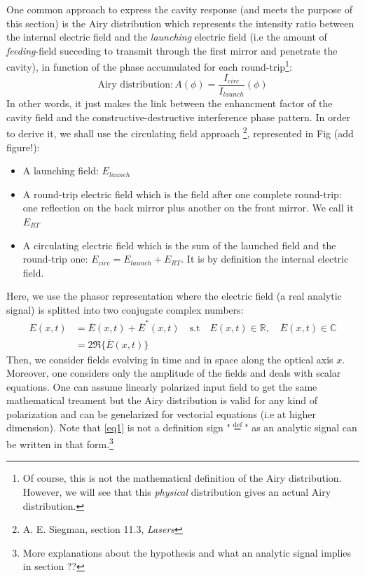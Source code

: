 \documentclass[12pt]{report}
\begin{document}
One common approach to express the cavity response (and meets the purpose of this section) is the Airy distribution which represents the intensity ratio between the internal electric field and the \textit{launching} electric field (i.e the amount of \textit{feeding}-field succeding to transmit through the first mirror and penetrate the cavity), in function of the phase accumulated for each round-trip\footnote{Of course, this is not the mathematical definition of the Airy distribution. However, we will see that this \textit{physical} distribution gives an actual Airy distribution.}:
\begin{equation}
\label{eqairy}
\textrm{Airy distribution} : A(\phi) = \frac{I_{circ}}{I_{launch}}(\phi)
\end{equation} 
In other words, it just makes the link between the enhancment factor of the cavity field and the constructive-destructive interference phase pattern. In order to derive it, we shall use the circulating field approach \footnote{A. E. Siegman, section 11.3, \textit{Lasers}}, represented in Fig (add figure!):
\begin{itemize}
	\item A launching field: $ E_{launch} $
	\item A round-trip electric field which is the field after one complete round-trip: one reflection on the back mirror plus another on the front mirror. We call it $ E_{RT}$
	\item A circulating electric field which is the sum of the launched field and the round-trip one: $ E_{circ} =  E_{launch} + E_{RT}$. It is by definition the internal electric field.
\end{itemize}

Here, we use the phasor representation where the electric field (a real analytic signal) is splitted into two conjugate complex numbers:
\begin{align} 
\label{eq1}
E(x, t) &= \overline{E}(x, t) + \overline{E}^*(x, t) \quad \textrm{s.t} \quad E(x, t) \in \mathbb{R}, \quad \overline{E}(x, t) \in \mathbb{C} \\\label{eq2}
&= 2 \Re \{  \overline{E}(x, t) \} 
\end{align}
Then, we consider fields evolving in time and in space along the optical axis $ x$. Moreover, one considers only the amplitude of the fields and deals with scalar equations. One can assume linearly polarized input field to get the same mathematical treament but the Airy distribution is valid for any kind of polarization and can be genelarized for vectorial equations (i.e at higher dimension). Note that \eqref{eq1} is not a definition sign "$\stackrel{\text{def}}{=}$" as an analytic signal can be written in that form.\footnote{More explanations about the hypothesis and what an analytic signal implies in section ??}
\end{document}

